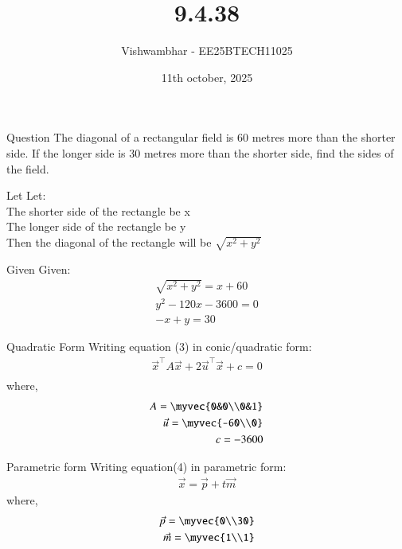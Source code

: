 \documentclass{beamer}
\title{9.4.38}
\date{11th october, 2025}
\author{Vishwambhar - EE25BTECH11025}
\begin{document}
\frame{\titlepage}
\begin{frame}{Question}
The diagonal of a rectangular field is 60 metres more than the shorter side. If the longer side is 30 metres more than the shorter side, find the sides of the field.\\
\end{frame}

\begin{frame}{Let}
Let:\\
The shorter side of the rectangle be x\\
The longer side of the rectangle be y\\
Then the diagonal of the rectangle will be $\sqrt{x^2+y^2}$\\
\end{frame}

\begin{frame}{Given}
Given:
\begin{align}
    \sqrt{x^2+y^2}=x+60\\
    y^2-120x-3600=0\\
    -x+y=30
\end{align}
\end{frame}

\begin{frame}{Quadratic Form}
Writing equation (3) in conic/quadratic form:
\begin{align}
    \vec{x}^\top A\vec{x}+2\vec{u}^\top\vec{x}+c=0\\
\end{align}
where,
\begin{align}
    A=\myvec{0&0\\0&1}\\
    \vec{u} = \myvec{-60\\0}\\
    c = -3600 
\end{align}
\end{frame}

\begin{frame}{Parametric form}
Writing equation(4) in parametric form:
\begin{align}
    \vec{x} = \vec{p} + t\vec{m}
\end{align}
where,
\begin{align}
    \vec{p} = \myvec{0\\30}\\
    \vec{m} = \myvec{1\\1}
\end{align}
\end{frame}
\end{document}

